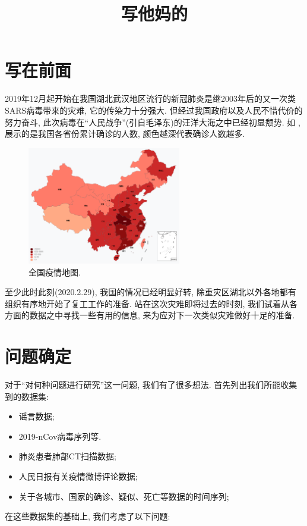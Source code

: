 \documentclass[lang=cn,11pt]{elegantpaper}
\title{写他妈的}
\date{}
\begin{document}
\section{写在前面}
2019年12月起开始在我国湖北武汉地区流行的新冠肺炎是继2003年后的又一次类SARS病毒带来的灾难, 它的传染力十分强大. 但经过我国政府以及人民不惜代价的努力奋斗, 此次病毒在“人民战争”(引自毛泽东)的汪洋大海之中已经初显颓势. 如 , 展示的是我国各省份累计确诊的人数, 颜色越深代表确诊人数越多.
\begin{figure}[htbp]
  \centering
  \includegraphics[width=0.6\textwidth]{map}
  \caption{全国疫情地图. \label{fig:map}}
\end{figure}

至少此时此刻(2020.2.29), 我国的情况已经明显好转, 除重灾区湖北以外各地都有组织有序地开始了复工工作的准备. 站在这次灾难即将过去的时刻, 我们试着从各方面的数据之中寻找一些有用的信息, 来为应对下一次类似灾难做好十足的准备. 

\section{问题确定}
对于“对何种问题进行研究”这一问题, 我们有了很多想法. 首先列出我们所能收集到的数据集: 
\begin{center}
  \begin{itemize}
    \item 谣言数据;
    \item 2019-nCov病毒序列等.
    \item 肺炎患者肺部CT扫描数据;
    \item 人民日报有关疫情微博评论数据;
    \item 关于各城市、国家的确诊、疑似、死亡等数据的时间序列; 
  \end{itemize}
\end{center}
在这些数据集的基础上, 我们考虑了以下问题:
\end{document}
